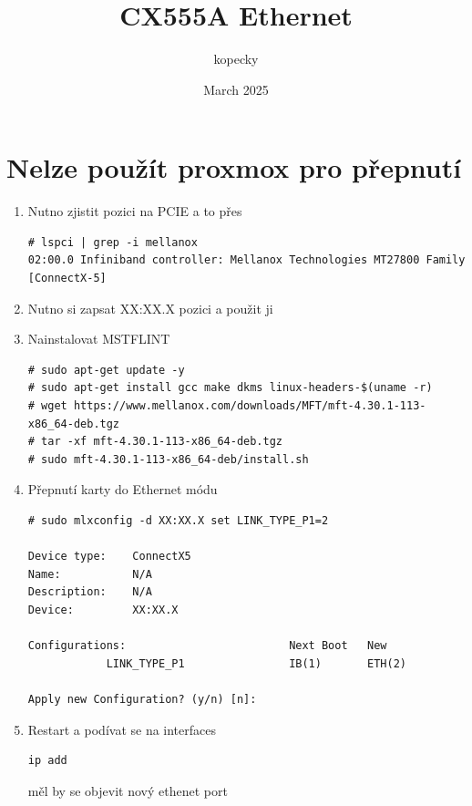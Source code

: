 \documentclass{article}
\title{CX555A Ethernet}
\author{kopecky }
\date{March 2025}
\begin{document}
\maketitle

\section{Nelze použít proxmox pro přepnutí}
\begin{enumerate}
    \item  Nutno zjistit pozici na PCIE a to přes
\begin{verbatim}
# lspci | grep -i mellanox
02:00.0 Infiniband controller: Mellanox Technologies MT27800 Family [ConnectX-5]
\end{verbatim}
\item Nutno si zapsat XX:XX.X pozici a použit ji


\item Nainstalovat MSTFLINT
\begin{verbatim}
# sudo apt-get update -y
# sudo apt-get install gcc make dkms linux-headers-$(uname -r) 
# wget https://www.mellanox.com/downloads/MFT/mft-4.30.1-113-x86_64-deb.tgz
# tar -xf mft-4.30.1-113-x86_64-deb.tgz 
# sudo mft-4.30.1-113-x86_64-deb/install.sh
\end{verbatim}

\item Přepnutí karty do Ethernet módu
\begin{verbatim}
# sudo mlxconfig -d XX:XX.X set LINK_TYPE_P1=2

Device type:    ConnectX5
Name:           N/A
Description:    N/A
Device:         XX:XX.X

Configurations:                         Next Boot   New
            LINK_TYPE_P1                IB(1)       ETH(2)

Apply new Configuration? (y/n) [n]:

\end{verbatim}

\item Restart a podívat se na interfaces
\begin{verbatim}
ip add
\end{verbatim}

měl by se objevit nový ethenet port
\end{enumerate}
\end{document}
